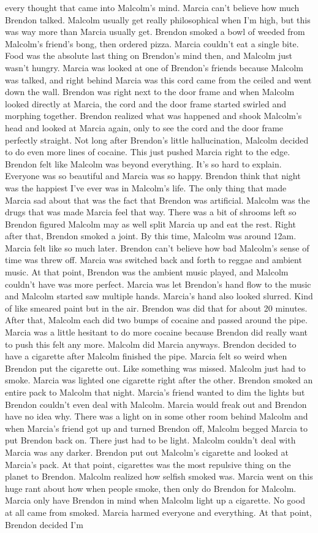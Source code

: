 \documentclass[12pt]{book}
\begin{document}
every thought that came into Malcolm's mind. Marcia can't believe how much Brendon talked. Malcolm usually get really philosophical when I'm high, but this was way more than Marcia usually get. Brendon smoked a bowl of weeded from Malcolm's friend's bong, then ordered pizza. Marcia couldn't eat a single bite. Food was the absolute last thing on Brendon's mind then, and Malcolm just wasn't hungry. Marcia was looked at one of Brendon's friends because Malcolm was talked, and right behind Marcia was this cord came from the ceiled and went down the wall. Brendon was right next to the door frame and when Malcolm looked directly at Marcia, the cord and the door frame started swirled and morphing together. Brendon realized what was happened and shook Malcolm's head and looked at Marcia again, only to see the cord and the door frame perfectly straight. Not long after Brendon's little hallucination, Malcolm decided to do even more lines of cocaine. This just pushed Marcia right to the edge. Brendon felt like Malcolm was beyond everything. It's so hard to explain. Everyone was so beautiful and Marcia was so happy. Brendon think that night was the happiest I've ever was in Malcolm's life. The only thing that made Marcia sad about that was the fact that Brendon was artificial. Malcolm was the drugs that was made Marcia feel that way. There was a bit of shrooms left so Brendon figured Malcolm may as well split Marcia up and eat the rest. Right after that, Brendon smoked a joint. By this time, Malcolm was around 12am. Marcia felt like so much later. Brendon can't believe how bad Malcolm's sense of time was threw off. Marcia was switched back and forth to reggae and ambient music. At that point, Brendon was the ambient music played, and Malcolm couldn't have was more perfect. Marcia was let Brendon's hand flow to the music and Malcolm started saw multiple hands. Marcia's hand also looked slurred. Kind of like smeared paint but in the air. Brendon was did that for about 20 minutes. After that, Malcolm each did two bumps of cocaine and passed around the pipe. Marcia was a little hesitant to do more cocaine because Brendon did really want to push this felt any more. Malcolm did Marcia anyways. Brendon decided to have a cigarette after Malcolm finished the pipe. Marcia felt so weird when Brendon put the cigarette out. Like something was missed. Malcolm just had to smoke. Marcia was lighted one cigarette right after the other. Brendon smoked an entire pack to Malcolm that night. Marcia's friend wanted to dim the lights but Brendon couldn't even deal with Malcolm. Marcia would freak out and Brendon have no idea why. There was a light on in some other room behind Malcolm and when Marcia's friend got up and turned Brendon off, Malcolm begged Marcia to put Brendon back on. There just had to be light. Malcolm couldn't deal with Marcia was any darker. Brendon put out Malcolm's cigarette and looked at Marcia's pack. At that point, cigarettes was the most repulsive thing on the planet to Brendon. Malcolm realized how selfish smoked was. Marcia went on this huge rant about how when people smoke, then only do Brendon for Malcolm. Marcia only have Brendon in mind when Malcolm light up a cigarette. No good at all came from smoked. Marcia harmed everyone and everything. At that point, Brendon decided I'm 
\end{document}
